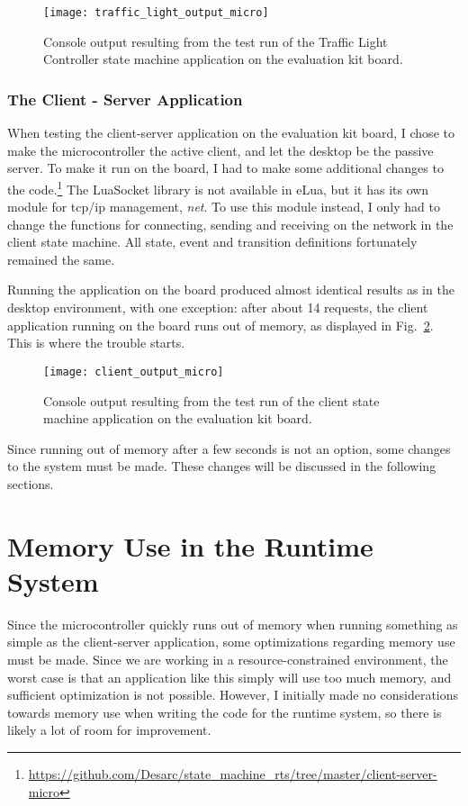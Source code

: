 \begin{figure}[htp]
	\centering
	\texttt{[image: traffic\_light\_output\_micro]}
	\caption[Output of Traffic Light Controller test run (microcontroller)]{Console output resulting from the test run of the Traffic Light Controller state machine application on the evaluation kit board.}
	\label{fig:traffic_light_output_micro}
\end{figure}

\subsubsection{The Client - Server Application}
When testing the client-server application on the evaluation kit board, I chose to make the microcontroller the active client, and let the desktop be the passive server. To make it run on the board, I had to make some additional changes to the code.\footnote{\url{https://github.com/Desarc/state_machine_rts/tree/master/client-server-micro}} The LuaSocket library is not available in eLua, but it has its own module for \gls{tcp}/\gls{ip} management, \emph{net}. To use this module instead, I only had to change the functions for connecting, sending and receiving on the network in the client state machine. All state, event and transition definitions fortunately remained the same.

\noindent
Running the application on the board produced almost identical results as in the desktop environment, with one exception: after about 14 requests, the client application running on the board runs out of memory, as displayed in Fig.~\ref{fig:client_output_micro}. This is where the trouble starts.

\begin{figure}[htp]
	\centering
	\texttt{[image: client\_output\_micro]}
	\caption[Output of client-server test run (microcontroller)]{Console output resulting from the test run of the client state machine application on the evaluation kit board.}
	\label{fig:client_output_micro}
\end{figure}

\noindent
Since running out of memory after a few seconds is not an option, some changes to the system must be made. These changes will be discussed in the following sections.

\section{Memory Use in the Runtime System}
\label{sec:memory_use}
Since the microcontroller quickly runs out of memory when running something as simple as the client-server application, some optimizations regarding memory use must be made. Since we are working in a resource-constrained environment, the worst case is that an application like this simply will use too much memory, and sufficient optimization is not possible. However, I initially made no considerations towards memory use when writing the code for the runtime system, so there is likely a lot of room for improvement.


